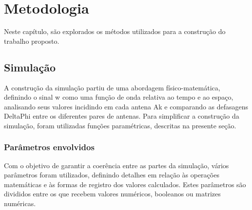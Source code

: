 \chapter{Metodologia}\label{cap:metodologia}

Neste capítulo, são explorados os métodos utilizados para a construção do trabalho proposto.


\section{Simulação}

A construção da simulação partiu de uma abordagem físico-matemática, definindo o sinal \ac{w} como uma função de onda relativa ao tempo e ao espaço, analisando seus valores incidindo em cada antena \ac{Ak} e comparando as defasagens \ac{DeltaPhi} entre os diferentes pares de antenas.
Para simplificar a construção da simulação, foram utilizadas funções paramétricas, descritas na presente seção.

\subsection{Parâmetros envolvidos}

Com o objetivo de garantir a coerência entre as partes da simulação, vários parâmetros foram utilizados, definindo detalhes em relação às operações matemáticas e às formas de registro dos valores calculados.
Estes parâmetros são divididos entre os que recebem valores numéricos, booleanos ou matrizes numéricas.

